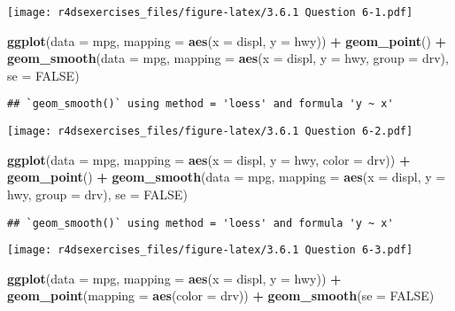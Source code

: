 \documentclass[
]{book}
\newenvironment{Shaded}{\begin{snugshade}}{\end{snugshade}}
\newcommand{\DataTypeTok}[1]{\textcolor[rgb]{0.13,0.29,0.53}{#1}}
\newcommand{\KeywordTok}[1]{\textcolor[rgb]{0.13,0.29,0.53}{\textbf{#1}}}
\newcommand{\NormalTok}[1]{#1}
\newcommand{\OperatorTok}[1]{\textcolor[rgb]{0.81,0.36,0.00}{\textbf{#1}}}
\newcommand{\OtherTok}[1]{\textcolor[rgb]{0.56,0.35,0.01}{#1}}
\newcommand{\StringTok}[1]{\textcolor[rgb]{0.31,0.60,0.02}{#1}}
\begin{document}
\texttt{[image: r4dsexercises\_files/figure-latex/3.6.1 Question 6-1.pdf]}

\begin{Shaded}
\begin{Highlighting}[]
\KeywordTok{ggplot}\NormalTok{(}\DataTypeTok{data =}\NormalTok{ mpg, }\DataTypeTok{mapping =} \KeywordTok{aes}\NormalTok{(}\DataTypeTok{x =}\NormalTok{ displ, }\DataTypeTok{y =}\NormalTok{ hwy)) }\OperatorTok{+}\StringTok{ }
\StringTok{  }\KeywordTok{geom_point}\NormalTok{() }\OperatorTok{+}\StringTok{ }
\StringTok{  }\KeywordTok{geom_smooth}\NormalTok{(}\DataTypeTok{data =}\NormalTok{ mpg, }\DataTypeTok{mapping =} \KeywordTok{aes}\NormalTok{(}\DataTypeTok{x =}\NormalTok{ displ, }\DataTypeTok{y =}\NormalTok{ hwy, }\DataTypeTok{group =}\NormalTok{ drv), }\DataTypeTok{se =} \OtherTok{FALSE}\NormalTok{)}
\end{Highlighting}
\end{Shaded}

\begin{verbatim}
## `geom_smooth()` using method = 'loess' and formula 'y ~ x'
\end{verbatim}

\texttt{[image: r4dsexercises\_files/figure-latex/3.6.1 Question 6-2.pdf]}

\begin{Shaded}
\begin{Highlighting}[]
\KeywordTok{ggplot}\NormalTok{(}\DataTypeTok{data =}\NormalTok{ mpg, }\DataTypeTok{mapping =} \KeywordTok{aes}\NormalTok{(}\DataTypeTok{x =}\NormalTok{ displ, }\DataTypeTok{y =}\NormalTok{ hwy, }\DataTypeTok{color =}\NormalTok{ drv)) }\OperatorTok{+}\StringTok{ }
\StringTok{  }\KeywordTok{geom_point}\NormalTok{() }\OperatorTok{+}\StringTok{ }
\StringTok{  }\KeywordTok{geom_smooth}\NormalTok{(}\DataTypeTok{data =}\NormalTok{ mpg, }\DataTypeTok{mapping =} \KeywordTok{aes}\NormalTok{(}\DataTypeTok{x =}\NormalTok{ displ, }\DataTypeTok{y =}\NormalTok{ hwy, }\DataTypeTok{group =}\NormalTok{ drv), }\DataTypeTok{se =} \OtherTok{FALSE}\NormalTok{)}
\end{Highlighting}
\end{Shaded}

\begin{verbatim}
## `geom_smooth()` using method = 'loess' and formula 'y ~ x'
\end{verbatim}

\texttt{[image: r4dsexercises\_files/figure-latex/3.6.1 Question 6-3.pdf]}

\begin{Shaded}
\begin{Highlighting}[]
\KeywordTok{ggplot}\NormalTok{(}\DataTypeTok{data =}\NormalTok{ mpg, }\DataTypeTok{mapping =} \KeywordTok{aes}\NormalTok{(}\DataTypeTok{x =}\NormalTok{ displ, }\DataTypeTok{y =}\NormalTok{ hwy)) }\OperatorTok{+}\StringTok{ }
\StringTok{  }\KeywordTok{geom_point}\NormalTok{(}\DataTypeTok{mapping =} \KeywordTok{aes}\NormalTok{(}\DataTypeTok{color =}\NormalTok{ drv)) }\OperatorTok{+}\StringTok{ }
\StringTok{  }\KeywordTok{geom_smooth}\NormalTok{(}\DataTypeTok{se =} \OtherTok{FALSE}\NormalTok{)}
\end{Highlighting}
\end{Shaded}
\end{document}
